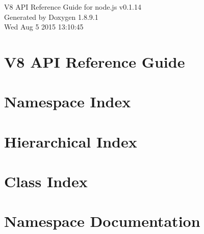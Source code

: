 \documentclass[twoside]{book}
\newcommand{\+}{\discretionary{\mbox{\scriptsize$\hookleftarrow$}}{}{}}
\newcommand{\clearemptydoublepage}{%
  \newpage{\pagestyle{empty}\cleardoublepage}%
}
\begin{document}
\hypersetup{pageanchor=false,
             bookmarks=true,
             bookmarksnumbered=true,
             pdfencoding=unicode
            }
\begin{titlepage}
\vspace*{7cm}
\begin{center}%
{\Large V8 A\+P\+I Reference Guide for node.\+js v0.1.14 }\\
\vspace*{1cm}
{\large Generated by Doxygen 1.8.9.1}\\
\vspace*{0.5cm}
{\small Wed Aug 5 2015 13:10:45}\\
\end{center}
\end{titlepage}
\clearemptydoublepage
\tableofcontents
\clearemptydoublepage
{}
\hypersetup{pageanchor=true}

\chapter{V8 A\+P\+I Reference Guide}
\label{index}\hypertarget{index}{}
\chapter{Namespace Index}

\chapter{Hierarchical Index}

\chapter{Class Index}

\chapter{Namespace Documentation}

\end{document}
